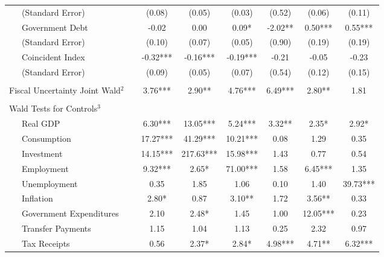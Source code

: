 \begin{table}
{\begin{center}
\begin{tabular}{l|S[table-format=3.2] S[table-format=3.2] S[table-format=3.2] S[table-format=3.2] S[table-format=3.2] S[table-format=3.2]}
~~~(Standard Error) & (0.08) & (0.05) & (0.03) & (0.52) & (0.06) & (0.11) \\ [0.2pc]
~~~Government Debt & -0.02 & 0.00 & 0.09* & -2.02** & 0.50*** & 0.55*** \\
~~~(Standard Error) & (0.10) & (0.07) & (0.05) & (0.90) & (0.19) & (0.19) \\ [0.2pc]
~~~Coincident Index & -0.32*** & -0.16*** & -0.19*** & -0.21 & -0.05 & -0.23 \\
~~~(Standard Error) & (0.09) & (0.05) & (0.07) & (0.54) & (0.12) & (0.15) \\ [0.2pc]
\hline
 &  \\ [-0.25pc]
Fiscal Uncertainty Joint Wald$^2$~~ & 3.76*** & 2.90** & 4.76*** & 6.49*** & 2.80** & 1.81 \\ [0.5pc] \hline
 &  \\ [-0.25pc]
Wald Tests for Controls$^3$ &  \\ [0.5pc]
~~~Real GDP & 6.30*** & 13.05*** & 5.24*** & 3.32** & 2.35* & 2.92* \\
~~~Consumption & 17.27*** & 41.29*** & 10.21*** & 0.08 & 1.29 & 0.35 \\
~~~Investment & 14.15*** & 217.63*** & 15.98*** & 1.43 & 0.77 & 0.54 \\
~~~Employment & 9.32*** & 2.65* & 71.00*** & 1.58 & 6.45*** & 1.35 \\
~~~Unemployment & 0.35 & 1.85 & 1.06 & 0.10 & 1.40 & 39.73*** \\
~~~Inflation & 2.80* & 0.87 & 3.10** & 1.72 & 3.56** & 0.33 \\
~~~Government Expenditures & 2.10 & 2.48* & 1.45 & 1.00 & 12.05*** & 0.23 \\
~~~Transfer Payments & 1.15 & 1.04 & 1.13 & 0.25 & 2.32 & 0.97 \\
~~~Tax Receipts & 0.56 & 2.37* & 2.84* & 4.98*** & 4.71** & 6.32*** \\



\end{tabular}
\end{center}}
\end{table}
